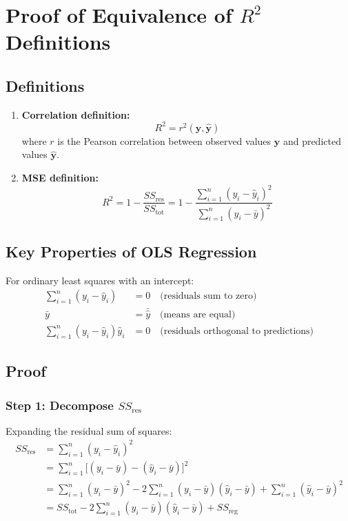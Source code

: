 \documentclass{article}
\begin{document}
\section*{Proof of Equivalence of $R^2$ Definitions}

\subsection*{Definitions}
\begin{enumerate}
    \item \textbf{Correlation definition:} 
    \begin{equation}
        R^2 = r^2(\mathbf{y}, \hat{\mathbf{y}})
    \end{equation}
    where $r$ is the Pearson correlation between observed values $\mathbf{y}$ and predicted values $\hat{\mathbf{y}}$.
    
    \item \textbf{MSE definition:}
    \begin{equation}
        R^2 = 1 - \frac{SS_{\text{res}}}{SS_{\text{tot}}} = 1 - \frac{\sum_{i=1}^n (y_i - \hat{y}_i)^2}{\sum_{i=1}^n (y_i - \bar{y})^2}
    \end{equation}
\end{enumerate}

\subsection*{Key Properties of OLS Regression}
For ordinary least squares with an intercept:
\begin{align}
    \sum_{i=1}^n (y_i - \hat{y}_i) &= 0 \quad \text{(residuals sum to zero)} \\
    \bar{y} &= \bar{\hat{y}} \quad \text{(means are equal)} \\
    \sum_{i=1}^n (y_i - \hat{y}_i)\hat{y}_i &= 0 \quad \text{(residuals orthogonal to predictions)}
\end{align}

\subsection*{Proof}

\subsubsection*{Step 1: Decompose $SS_{\text{res}}$}
Expanding the residual sum of squares:
\begin{align}
    SS_{\text{res}} &= \sum_{i=1}^n (y_i - \hat{y}_i)^2 \\
    &= \sum_{i=1}^n \big[(y_i - \bar{y}) - (\hat{y}_i - \bar{y})\big]^2 \\
    &= \sum_{i=1}^n (y_i - \bar{y})^2 - 2\sum_{i=1}^n (y_i - \bar{y})(\hat{y}_i - \bar{y}) + \sum_{i=1}^n (\hat{y}_i - \bar{y})^2 \\
    &= SS_{\text{tot}} - 2\sum_{i=1}^n (y_i - \bar{y})(\hat{y}_i - \bar{y}) + SS_{\text{reg}}
\end{align}
\end{document}
